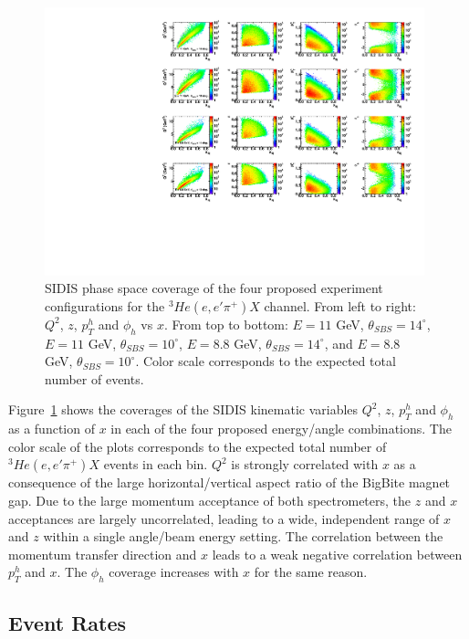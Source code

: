 \begin{figure}[h]
  \begin{center}
    \includegraphics[width=0.98\textwidth]{figures/kine14deg10deg_2Dcomparison.pdf}
  \end{center}
  \caption{\label{kine14_10_2D} SIDIS phase space coverage of the four proposed experiment configurations for the $^3He(e,e'\pi^+)X$ channel. From left to right: $Q^2$, $z$, $p_T^h$ and $\phi_h$ vs $x$. From top to bottom: $E = 11$ GeV, $\theta_{SBS} = 14^\circ$, $E = 11$ GeV, $\theta_{SBS}=10^\circ$, $E = 8.8$ GeV, $\theta_{SBS}=14^\circ$, and $E = 8.8$ GeV, $\theta_{SBS}=10^\circ$. Color scale corresponds to the expected total number of events.}
\end{figure}
Figure~\ref{kine14_10_2D} shows the coverages of the SIDIS kinematic variables $Q^2$, $z$, $p_T^h$ and $\phi_h$ as a function of $x$ in each of the four proposed energy/angle combinations. The color scale of the plots corresponds to the expected total number of $^3He(e,e'\pi^+)X$ events in each bin. $Q^2$ is strongly correlated with $x$ as a consequence of the large horizontal/vertical aspect ratio of the BigBite magnet gap. Due to the large momentum acceptance of both spectrometers, the $z$ and $x$ acceptances are largely uncorrelated, leading to a wide, independent range of $x$ and $z$ within a single angle/beam energy setting. The correlation between the momentum transfer direction and $x$ leads to a weak negative correlation between $p_T^h$ and $x$. The $\phi_h$ coverage increases with $x$ for the same reason.
\subsection{Event Rates}

